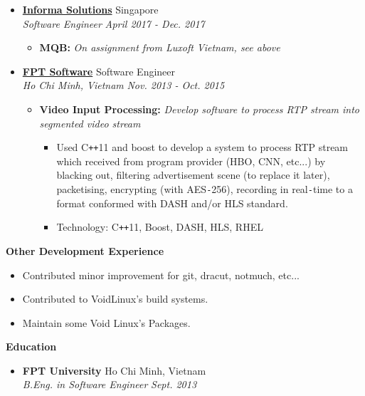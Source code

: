 \documentclass[letterpaper,11pt]{article}
\newcommand{\resheading}[1]{
  {\large \colorbox{mygrey}
    {\begin{minipage}{\textwidth}
      {\textbf{#1 \vphantom{p\^{E}}}}
    \end{minipage}}}}
\newcommand{\ressubheading}[4]{
		\textbf{#1} \hfill #2 \\
    \textit{#3} \hfill \textit{#4}}
\newcommand{\resproject}[2]{
  \textbf{#1:} \textit{#2}}
\def\Plus{\texttt{+}}
\def\Minus{\texttt{-}}
\def\cplusplus{C\Plus\Plus}
\begin{document}
\begin{itemize}
\item \ressubheading{\href{http://www.informa.com.sg/}{Informa
    Solutions}}{Singapore}{Software Engineer}{April 2017 - Dec. 2017}
  \begin{itemize}
    \item \resproject{MQB}{On assignment from Luxoft Vietnam, see above}
  \end{itemize}

  \newpage

\item \ressubheading{\href{https://www.fpt-software.com/}{FPT
    Software}}{Software Engineer}{Ho Chi Minh, Vietnam}{Nov. 2013 - Oct. 2015}
  \begin{itemize}
    \item \resproject{Video Input Processing}{Develop software to process RTP
      stream into segmented video stream}
         \begin{itemize}
           \item Used \cplusplus{}11 and boost to develop a system to process
             RTP stream which received from program provider (HBO, CNN,
             etc...) by blacking out, filtering advertisement scene (to
             replace it later), packetising, encrypting (with AES\Minus{}256),
             recording in real\Minus{}time to a format conformed with DASH
             and/or HLS standard.
           \item Technology: \cplusplus{}11, Boost, DASH, HLS, RHEL
         \end{itemize}
  \end{itemize}

\end{itemize}

\resheading{Other Development Experience}
\begin{itemize}
  \item Contributed minor improvement for git, dracut, notmuch, etc...
  \item Contributed to VoidLinux's build systems.
  \item Maintain some Void Linux's Packages.
\end{itemize}

\resheading{Education}
\begin{itemize}
  \item[]
    \ressubheading{FPT University}{Ho Chi Minh, Vietnam}{B.Eng. in Software
    Engineer}{Sept. 2013}
\end{itemize}
\end{document}
